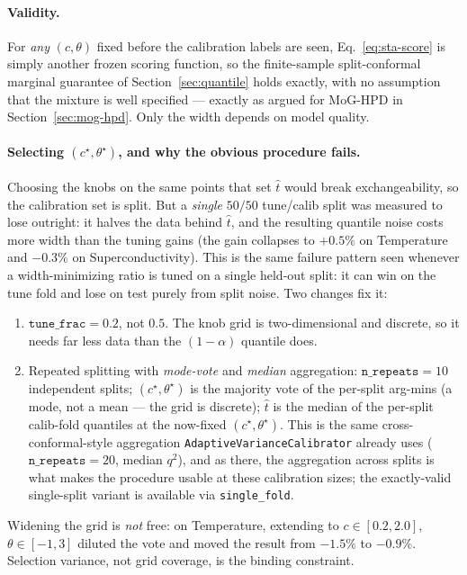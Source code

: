 \documentclass[11pt]{article}
\begin{document}
\paragraph{Validity.} For \emph{any} $(c,\theta)$ fixed before the calibration labels are seen,
Eq.~\eqref{eq:sta-score} is simply another frozen scoring function, so the finite-sample
split-conformal marginal guarantee of Section~\ref{sec:quantile} holds exactly, with no assumption
that the mixture is well specified --- exactly as argued for MoG-HPD in
Section~\ref{sec:mog-hpd}. Only the width depends on model quality.

\paragraph{Selecting $(c^\star,\theta^\star)$, and why the obvious procedure fails.} Choosing the
knobs on the same points that set $\hat t$ would break exchangeability, so the calibration set is
split. But a \emph{single} $50/50$ tune/calib split was measured to lose outright: it halves the
data behind $\hat t$, and the resulting quantile noise costs more width than the tuning gains
(the gain collapses to $+0.5\%$ on Temperature and $-0.3\%$ on Superconductivity). This is the same
failure pattern seen whenever a width-minimizing ratio is tuned on a single held-out split: it can
win on the tune fold and lose on test purely from split noise. Two changes fix it:
\begin{enumerate}
\item $\texttt{tune\_frac}=0.2$, not $0.5$. The knob grid is two-dimensional and discrete, so it
needs far less data than the $(1-\alpha)$ quantile does.
\item Repeated splitting with \emph{mode-vote} and \emph{median} aggregation:
$\texttt{n\_repeats}=10$ independent splits; $(c^\star,\theta^\star)$ is the majority vote of the
per-split arg-mins (a mode, not a mean --- the grid is discrete); $\hat t$ is the median of the
per-split calib-fold quantiles at the now-fixed $(c^\star,\theta^\star)$. This is the same
cross-conformal-style aggregation \texttt{AdaptiveVarianceCalibrator} already uses
($\texttt{n\_repeats}=20$, median $q^2$), and as there, the aggregation across splits is what
makes the procedure usable at these calibration sizes; the exactly-valid single-split variant is
available via \texttt{single\_fold}.
\end{enumerate}
Widening the grid is \emph{not} free: on Temperature, extending to
$c\in[0.2,2.0]$, $\theta\in[-1,3]$ diluted the vote and moved the result from $-1.5\%$ to
$-0.9\%$. Selection variance, not grid coverage, is the binding constraint.
\end{document}

